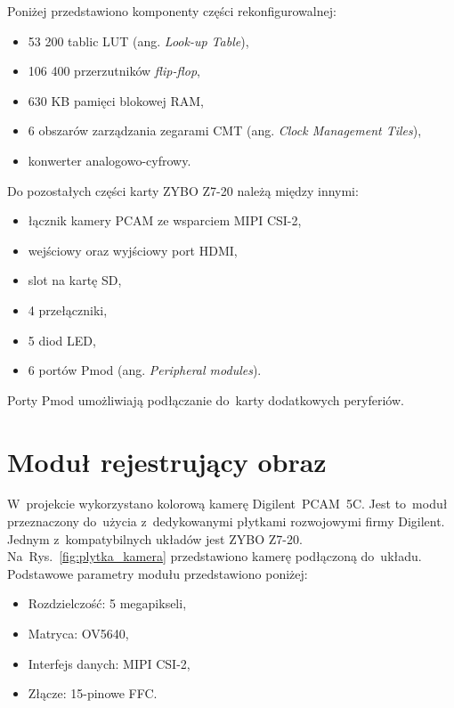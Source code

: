 Poniżej przedstawiono komponenty części rekonfigurowalnej:
\begin{itemize}
	\item 53 200 tablic LUT (ang. \textit{Look-up Table}),
	\item 106 400 przerzutników \textit{flip-flop},
	\item 630 KB pamięci blokowej RAM,
	\item 6 obszarów zarządzania zegarami CMT (ang. \textit{Clock Management Tiles}),
	\item konwerter analogowo-cyfrowy.
\end{itemize}
Do pozostałych części karty ZYBO Z7-20 należą między innymi:
\begin{itemize}
	\item łącznik kamery PCAM ze wsparciem MIPI CSI-2,
	\item wejściowy oraz wyjściowy port HDMI,
	\item slot na kartę SD,
	\item 4 przełączniki,
	\item 5 diod LED,
	\item 6 portów Pmod (ang. \textit{Peripheral modules}).
\end{itemize}
Porty Pmod umożliwiają podłączanie do~karty dodatkowych peryferiów.

\section{Moduł rejestrujący obraz}
\label{sec:pcam}

W~projekcie wykorzystano kolorową kamerę Digilent~PCAM~5C. 
Jest to~moduł przeznaczony do~użycia z~dedykowanymi płytkami rozwojowymi firmy Digilent. 
Jednym z~kompatybilnych układów jest ZYBO Z7-20. Na~Rys.~\ref{fig:plytka_kamera} przedstawiono kamerę podłączoną do~układu.
Podstawowe parametry modułu przedstawiono poniżej:

\begin{itemize}
	\item Rozdzielczość: 5 megapikseli,
	\item Matryca: OV5640,
	\item Interfejs danych: MIPI CSI-2,
	\item Złącze: 15-pinowe FFC.
\end{itemize}

